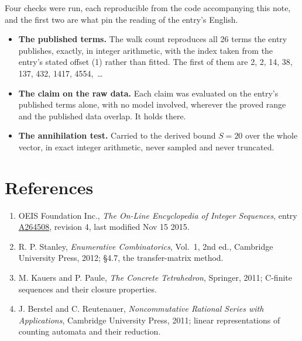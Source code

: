 \documentclass[11pt]{article}
\theoremstyle{definition}
\begin{document}
Four checks were run, each reproducible from the code accompanying this note, and the first two are what pin the reading of the entry's English.

\begin{itemize}

\item {\bfseries The published terms.} The walk count reproduces all 26 terms the entry publishes, exactly, in integer arithmetic, with the index taken from the entry's stated offset (1) rather than fitted. The first of them are 2, 2, 14, 38, 137, 432, 1417, 4554,~\dots

\item {\bfseries The claim on the raw data.} Each claim was evaluated on the entry's published terms alone, with no model involved, wherever the proved range and the published data overlap. It holds there.

\item {\bfseries The annihilation test.} Carried to the derived bound $S = 20$ over the whole vector, in exact integer arithmetic, never sampled and never truncated.

\end{itemize}

\section{References}

\begin{enumerate}

\item OEIS Foundation Inc., \emph{The On-Line Encyclopedia of Integer Sequences}, entry \href{https://oeis.org/A264508}{A264508}, revision 4, last modified Nov 15 2015.

\item R. P. Stanley, \emph{Enumerative Combinatorics}, Vol.~1, 2nd ed., Cambridge University Press, 2012; \S4.7, the transfer-matrix method.

\item M. Kauers and P. Paule, \emph{The Concrete Tetrahedron}, Springer, 2011; C-finite sequences and their closure properties.

\item J. Berstel and C. Reutenauer, \emph{Noncommutative Rational Series with Applications}, Cambridge University Press, 2011; linear representations of counting automata and their reduction.

\end{enumerate}
\end{document}

